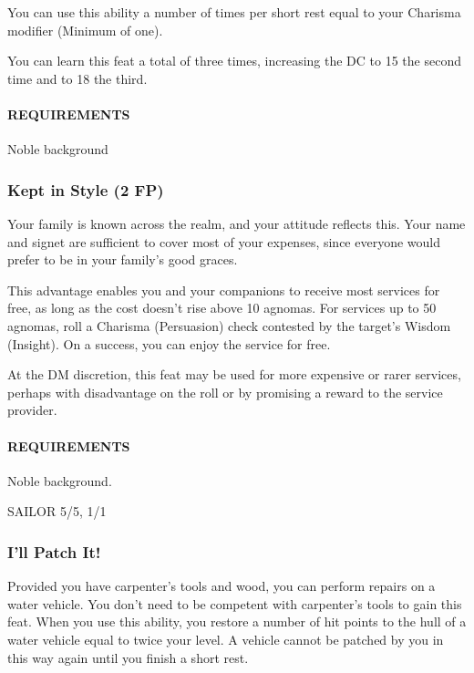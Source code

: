         You can use this ability a number of times per short rest equal to your Charisma modifier (Minimum of one).

        You can learn this feat a total of three times, increasing the DC to 15 the second time and to 18 the third.
        \paragraph{REQUIREMENTS} Noble background

    \subsubsection{Kept in Style (2 FP)} \label{feat::keptinstyle}
        Your family is known across the realm, and your attitude reflects this.
        Your name and signet are sufficient to cover most of your expenses, since everyone would prefer to be in your family's good graces.

        This advantage enables you and your companions to receive most services for free, as long as the cost doesn't rise above 10 agnomas.
        For services up to 50 agnomas, roll a Charisma (Persuasion) check contested by the target's Wisdom (Insight).
        On a success, you can enjoy the service for free.

        At the DM discretion, this feat may be used for more expensive or rarer services, perhaps with disadvantage on the roll or by promising a reward to the service provider.
        \paragraph{REQUIREMENTS} Noble background.

SAILOR 5/5, 1/1
    \subsubsection{I'll Patch It!} \label{feat::illpatchit}
        Provided you have carpenter's tools and wood, you can perform repairs on a water vehicle.
        You don't need to be competent with carpenter's tools to gain this feat.
        When you use this ability, you restore a number of hit points to the hull of a water vehicle equal to twice your level.
        A vehicle cannot be patched by you in this way again until you finish a short rest.
